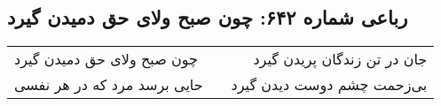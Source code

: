 \begin{center}
\section*{رباعی شماره ۶۴۲: چون صبح ولای حق دمیدن گیرد}
\label{sec:0642}
\begin{longtable}{l p{0.5cm} r}
چون صبح ولای حق دمیدن گیرد
&&
جان در تن زندگان پریدن گیرد
\\
حایی برسد مرد که در هر نفسی
&&
بی‌زحمت چشم دوست دیدن گیرد
\\
\end{longtable}
\end{center}
